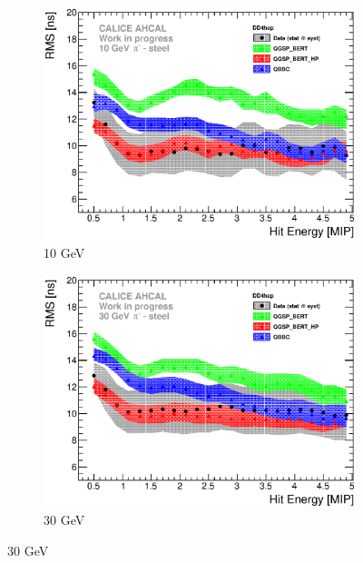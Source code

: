 \begin{figure}[htbp!]
  \begin{subfigure}[t]{0.49\textwidth}
    \centering
    \includegraphics[width=1\textwidth]{../Thesis_Plots/Timing/Pions/Plots/ComparisonToSim/RMS_Energy_10GeV_DD4hep.eps}
    \caption{10 GeV}\label{fig:Energy_RMS_SimData_10GeV_DD4hep}
  \end{subfigure}
  \hfill
  \begin{subfigure}[t]{0.49\textwidth}
    \centering
    \includegraphics[width=1\textwidth]{../Thesis_Plots/Timing/Pions/Plots/ComparisonToSim/RMS_Energy_30GeV_DD4hep.eps}
    \caption{30 GeV}\label{fig:Energy_RMS_SimData_30GeV_DD4hep}
  \end{subfigure}
  \hfill

\end{figure}

